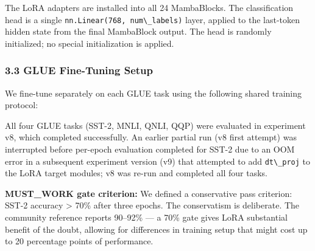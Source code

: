The LoRA adapters are installed into all 24 MambaBlocks. The classification head is a single \texttt{nn.Linear(768, num\textbackslash \_labels)} layer, applied to the last-token hidden state from the final MambaBlock output. The head is randomly initialized; no special initialization is applied.

\subsubsection{3.3 GLUE Fine-Tuning Setup}

We fine-tune separately on each GLUE task using the following shared training protocol:

\begin{table}[htbp]
\centering
{}
\end{table}

All four GLUE tasks (SST-2, MNLI, QNLI, QQP) were evaluated in experiment v8, which completed successfully. An earlier partial run (v8 first attempt) was interrupted before per-epoch evaluation completed for SST-2 due to an OOM error in a subsequent experiment version (v9) that attempted to add \texttt{dt\textbackslash \_proj} to the LoRA target modules; v8 was re-run and completed all four tasks.

\textbf{MUST\_WORK gate criterion:} We defined a conservative pass criterion: SST-2 accuracy > 70\% after three epochs. The conservatism is deliberate. The community reference reports 90--92\% --- a 70\% gate gives LoRA substantial benefit of the doubt, allowing for differences in training setup that might cost up to 20 percentage points of performance.

